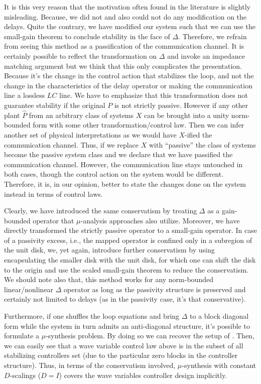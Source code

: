 It is this very reason that the motivation often found in the literature is slightly misleading. Because, we did not 
and also could not do any modification on the delays. Quite the contrary, we have modified our system such that we can use 
the small-gain theorem to conclude stability in the face of $\Delta$. Therefore, we refrain from seeing 
this method as a passification of the communication channel. It is certainly possible to reflect the transformation 
on $\Delta$ and invoke an impedance matching argument but we think that this 
only complicates the presentation. Because it's the change in the control action that stabilizes the loop, and not the 
change in the characteristics of the delay operator or making the communication line a lossless $LC$ line.
We have to emphasize that this transformation does not guarantee stability if the original $P$ is not strictly passive.
However if any other plant $\hat{P}$ from an arbitrary class of systems $X$ can be brought into a unity norm-bounded form 
with some other transformation/control law. Then we can infer another set of physical interpretations as we would have 
$X$-ified the communication channel. Thus, if we replace $X$ with \enquote{passive} the class of systems become the passive 
system class and we declare that we have passified the communication channel. However, the communication line stays untouched 
in both cases, though the control action on the system would be different. Therefore, it is, in our opinion, better to state 
the changes done on the system instead in terms of control laws.  


Clearly, we have introduced the same conservatism by treating $\Delta$ as a gain-bounded operator 
that $\mu$-analysis approaches also utilize. Moreover, we have directly transformed the strictly passive 
operator to a small-gain operator. In case of a passivity excess, i.e., the mapped operator is confined only 
in a subregion of the unit disk, we, yet again, introduce further conservatism by using encapsulating the smaller disk 
with the unit disk, for which one can shift the disk to the origin and use the scaled small-gain theorem to reduce the 
conservatism. We should note also that, this method works for any norm-bounded linear/nonlinear $\Delta$ operator as long as the 
passivity structure is preserved and certainly not limited to delays (as in the passivity case, it's that conservative). 

Furthermore, if one shuffles the loop equations and bring $\Delta$ to a block diagonal form while the system in turn admits 
an anti-diagonal structure, it's possible to formulate a $\mu$-synthesis problem. By doing so we can recover the setup of 
\cite{leungfa}. Then, we can easily see that a wave variable control law above is in the subset of all stabilizing controllers 
set (due to the particular zero blocks in the controller structure). Thus, in terms of the conservatism involved, $\mu$-synthesis 
with constant $D$-scalings ($D=I$) covers the wave variables controller design implicitly.


